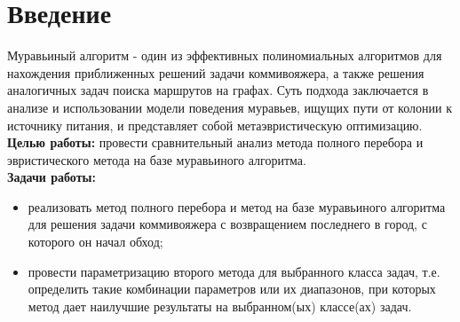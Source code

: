 \chapter*{Введение}


Муравьиный алгоритм - один из эффективных полиномиальных алгоритмов для нахождения приближенных решений задачи коммивояжера, а также решения аналогичных задач поиска маршрутов на графах. Суть подхода заключается в анализе и использовании модели поведения муравьев, ищущих пути от колонии к источнику питания, и представляет собой метаэвристическую оптимизацию.
\\


\textbf{Целью работы:}
провести сравнительный анализ метода полного перебора и эвристического метода на базе муравьиного алгоритма.
\\

\textbf{Задачи работы:}

\begin{itemize}
    \setlength{\itemsep}{0em}
    \item реализовать метод полного перебора и метод на базе муравьиного алгоритма для решения задачи коммивояжера с возвращением последнего в город, с которого он начал обход;
    \item провести параметризацию второго метода для выбранного класса задач, т.е. определить такие комбинации параметров или их диапазонов, при которых метод дает наилучшие результаты на выбранном(ых) классе(ах) задач.
\end{itemize}
